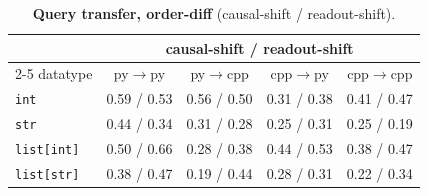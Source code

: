 \begin{table}[ht]\centering\small
\begin{tabular}{lcccc}
\toprule
& \multicolumn{4}{c}{causal-shift / readout-shift} \\
\cmidrule(lr){2-5}
datatype & py$\to$py & py$\to$cpp & cpp$\to$py & cpp$\to$cpp \\
\midrule
\texttt{int} & 0.59 / 0.53 & 0.56 / 0.50 & 0.31 / 0.38 & 0.41 / 0.47 \\
\texttt{str} & 0.44 / 0.34 & 0.31 / 0.28 & 0.25 / 0.31 & 0.25 / 0.19 \\
\texttt{list[int]} & 0.50 / 0.66 & 0.28 / 0.38 & 0.44 / 0.53 & 0.38 / 0.47 \\
\texttt{list[str]} & 0.38 / 0.47 & 0.19 / 0.44 & 0.28 / 0.31 & 0.22 / 0.34 \\
\bottomrule
\end{tabular}
\caption{\textbf{Query transfer, order-diff} (causal-shift / readout-shift).}
\label{tab:q-diff}
\end{table}
